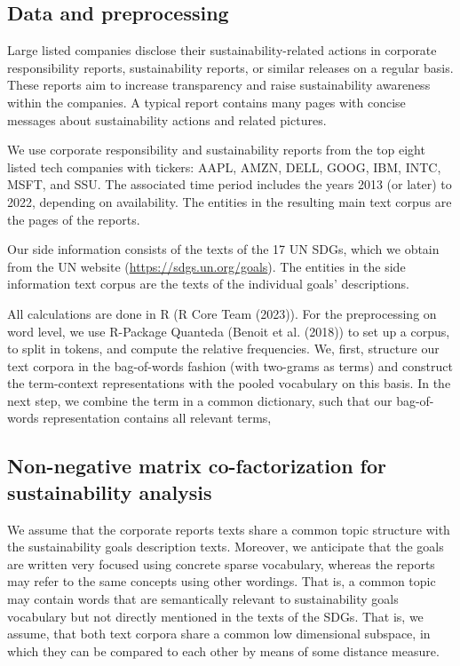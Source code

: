\documentclass[
]{article}
\begin{document}
\hypertarget{data-and-preprocessing}{%
\subsection{Data and preprocessing}\label{data-and-preprocessing}}

Large listed companies disclose their sustainability-related actions in corporate responsibility reports, sustainability reports, or similar releases on a regular basis. These reports aim to increase transparency and raise sustainability awareness within the companies. A typical report contains many pages with concise messages about sustainability actions and related pictures.

We use corporate responsibility and sustainability reports from the top eight listed tech companies with tickers: AAPL, AMZN, DELL, GOOG, IBM, INTC, MSFT, and SSU. The associated time period includes the years 2013 (or later) to 2022, depending on availability. The entities in the resulting main text corpus are the pages of the reports.

Our side information consists of the texts of the 17 UN SDGs, which we obtain from the UN website (\url{https://sdgs.un.org/goals}). The entities in the side information text corpus are the texts of the individual goals' descriptions.

All calculations are done in R (R Core Team (2023)). For the preprocessing on word level, we use R-Package Quanteda (Benoit et al. (2018)) to set up a corpus, to split in tokens, and compute the relative frequencies. We, first, structure our text corpora in the bag-of-words fashion (with two-grams as terms) and construct the term-context representations with the pooled vocabulary on this basis. In the next step, we combine the term in a common dictionary, such that our bag-of-words representation contains all relevant terms,

\hypertarget{non-negative-matrix-co-factorization-for-sustainability-analysis}{%
\subsection{Non-negative matrix co-factorization for sustainability analysis}\label{non-negative-matrix-co-factorization-for-sustainability-analysis}}

We assume that the corporate reports texts share a common topic structure with the sustainability goals description texts.
Moreover, we anticipate that the goals are written very focused using concrete sparse vocabulary, whereas the reports may refer to the same concepts using other wordings. That is, a common topic may contain words that are semantically relevant to sustainability goals vocabulary but not directly mentioned in the texts of the SDGs.
That is, we assume, that both text corpora share a common low dimensional subspace, in which they can be compared to each other by means of some distance measure.
\end{document}
